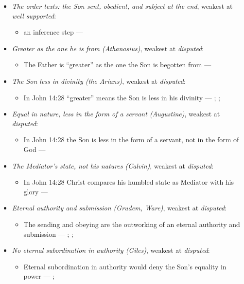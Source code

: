 \documentclass[11pt,paper=\testimonypaper,DIV=13,parskip=false]{scrartcl}
\begin{document}
\begin{itemize}
\item \emph{The order texts: the Son sent, obedient, and subject at the end}, weakest at \emph{well supported}:
\begin{itemize}
\item an inference step --- \cite[3, The Triune God]{kibbey-living-systematic-theology-2026}
\end{itemize}
\item \emph{Greater as the one he is from (Athanasius)}, weakest at \emph{disputed}:
\begin{itemize}
\item The Father is “greater” as the one the Son is begotten from --- \cite[Against the Arians I.13.58]{schaff-nicene-post-nicene-fathers-2-4-1892}
\end{itemize}
\item \emph{The Son less in divinity (the Arians)}, weakest at \emph{disputed}:
\begin{itemize}
\item In John 14:28 “greater” means the Son is less in his divinity --- \cite[De Synodis 28]{schaff-nicene-post-nicene-fathers-2-4-1892}; \cite[On the Trinity I.7.14]{schaff-nicene-post-nicene-fathers-1-3-1887}; \cite[102]{calvin-commentary-john-2-1847}
\end{itemize}
\item \emph{Equal in nature, less in the form of a servant (Augustine)}, weakest at \emph{disputed}:
\begin{itemize}
\item In John 14:28 the Son is less in the form of a servant, not in the form of God --- \cite[On the Trinity I.7.14]{schaff-nicene-post-nicene-fathers-1-3-1887}
\end{itemize}
\item \emph{The Mediator’s state, not his natures (Calvin)}, weakest at \emph{disputed}:
\begin{itemize}
\item In John 14:28 Christ compares his humbled state as Mediator with his glory --- \cite[102--103]{calvin-commentary-john-2-1847}
\end{itemize}
\item \emph{Eternal authority and submission (Grudem, Ware)}, weakest at \emph{disputed}:
\begin{itemize}
\item The sending and obeying are the outworking of an eternal authority and submission --- \cite[40]{grudem-doctrinal-deviations-2015}; \cite{grudem-ets-trinity-2016}; \cite{ware-father-son-holy-spirit-2005}
\end{itemize}
\item \emph{No eternal subordination in authority (Giles)}, weakest at \emph{disputed}:
\begin{itemize}
\item Eternal subordination in authority would deny the Son’s equality in power --- \cite[323]{giles-ets-trinity-2008}; \cite{giles-jesus-and-the-father-2006}
\end{itemize}
\end{itemize}
\end{document}
